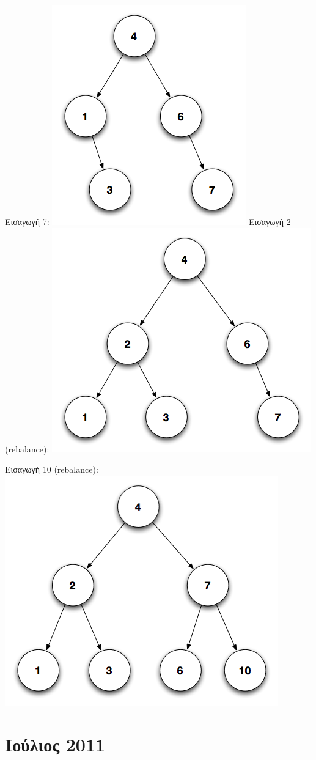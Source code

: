 \documentclass[a4paper,10pt]{article}
\begin{document}
Εισαγωγή 7:
\includegraphics[scale=0.3]{files/im4_7.png}
Εισαγωγή 2 (rebalance):
\includegraphics[scale=0.3]{files/im5_2.png}

Εισαγωγή 10 (rebalance):
\includegraphics[scale=0.3]{files/im6_10.png}


\section{Ιούλιος 2011}


\end{document}
